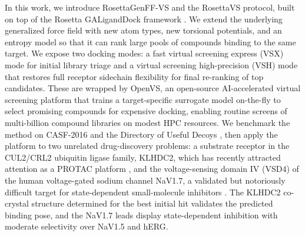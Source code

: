 \documentclass[10pt]{article}
\begin{document}
In this work, we introduce RosettaGenFF-VS and the RosettaVS protocol, built
on top of the Rosetta GALigandDock framework \citep{leman2020rosetta}. We
extend the underlying generalized force field with new atom types, new
torsional potentials, and an entropy model so that it can rank large pools of
compounds binding to the same target. We expose two docking modes: a fast
virtual screening express (VSX) mode for initial library triage and a virtual
screening high-precision (VSH) mode that restores full receptor sidechain
flexibility for final re-ranking of top candidates. These are wrapped by
OpenVS, an open-source AI-accelerated virtual screening platform that trains
a target-specific surrogate model on-the-fly to select promising compounds
for expensive docking, enabling routine screens of multi-billion compound
libraries on modest HPC resources. We benchmark the method on CASF-2016
\citep{su2019casf2016} and the Directory of Useful Decoys
\citep{mysinger2012dude}, then apply the platform to two unrelated
drug-discovery problems: a substrate receptor in the CUL2/CRL2 ubiquitin
ligase family, KLHDC2, which has recently attracted attention as a PROTAC
platform \citep{slusarz2023klhdc3}, and the voltage-sensing domain IV (VSD4)
of the human voltage-gated sodium channel NaV1.7, a validated but notoriously
difficult target for state-dependent small-molecule inhibitors
\citep{wang2015nav17methyl}. The KLHDC2 co-crystal structure determined for
the best initial hit validates the predicted binding pose, and the NaV1.7
leads display state-dependent inhibition with moderate selectivity over
NaV1.5 and hERG.
\end{document}

